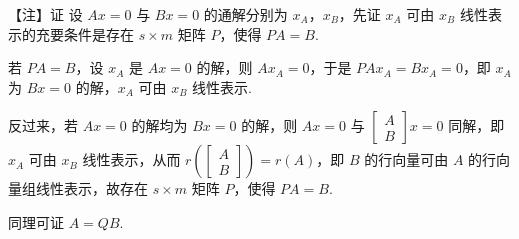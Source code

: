 \begin{fnote}
【注】证 设 $Ax=0$ 与 $Bx=0$ 的通解分别为 $x_A$，$x_B$，先证 $x_A$ 可由 $x_B$ 线性表示的充要条件是存在 $s\times m$ 矩阵 $P$，使得 $PA=B$.

若 $PA=B$，设 $x_A$ 是 $Ax=0$ 的解，则 $Ax_A=0$，于是 $PAx_A=Bx_A=0$，即 $x_A$ 为 $Bx=0$ 的解，$x_A$ 可由 $x_B$ 线性表示.

反过来，若 $Ax=0$ 的解均为 $Bx=0$ 的解，则 $Ax=0$ 与 $\begin{bmatrix}A\\B\end{bmatrix}x=0$ 同解，即 $x_A$ 可由 $x_B$ 线性表示，从而 $r\left(\begin{bmatrix}A\\B\end{bmatrix}\right)=r(A)$，即 $B$ 的行向量可由 $A$ 的行向量组线性表示，故存在 $s\times m$ 矩阵 $P$，使得 $PA=B$.

同理可证 $A=QB$.
\end{fnote}

